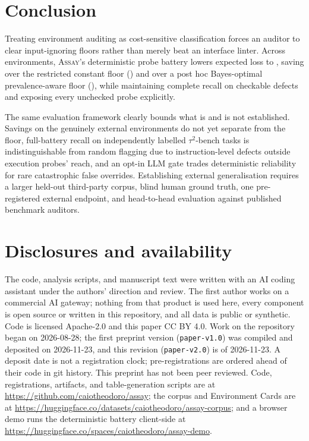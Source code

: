 \documentclass[11pt]{article}
\newcommand{\assay}{\textsc{Assay}}
\begin{document}
\section{Conclusion}
\label{sec:conclusion}

Treating environment auditing as cost-sensitive classification forces an auditor to clear
input-ignoring floors rather than merely beat an interface linter. Across \nEnv{} environments,
\assay{}'s deterministic probe battery lowers expected loss to \lossAssay{}, saving
\savedRestricted{} over the restricted constant floor (\floorRestricted{}) and \savedPrevResearch{}
over a post hoc Bayes-optimal prevalence-aware floor (\lossPrevResearch{}), while maintaining
complete recall on checkable defects and exposing every unchecked probe explicitly.

The same evaluation framework clearly bounds what is and is not established. Savings on the
\nExternal{} genuinely external environments do not yet separate from the floor, full-battery
recall on independently labelled $\tau^2$-bench tasks is indistinguishable from random flagging due
to instruction-level defects outside execution probes' reach, and an opt-in LLM gate trades
deterministic reliability for rare catastrophic false overrides. Establishing external
generalisation requires a larger held-out third-party corpus, blind human ground truth, one
pre-registered external endpoint, and head-to-head evaluation against published benchmark auditors.

\section*{Disclosures and availability}

The code, analysis scripts, and manuscript text were written with an AI coding assistant under the
authors' direction and review. The first author works on a commercial AI gateway; nothing from that
product is used here, every component is open source or written in this repository, and all data is
public or synthetic. Code is licensed Apache-2.0 and this paper CC BY 4.0. Work on the repository
began on 2026-08-28; the first preprint version (\texttt{paper-v1.0}) was compiled and deposited on
2026-11-23, and this revision (\texttt{paper-v2.0}) is of 2026-11-23. A deposit date is not a
registration clock; pre-registrations are ordered ahead of their code in git history. This preprint
has not been peer reviewed. Code, registrations, artifacts, and table-generation scripts are at
\url{https://github.com/caiotheodoro/assay}; the corpus and Environment Cards are at
\url{https://huggingface.co/datasets/caiotheodoro/assay-corpus}; and a browser demo runs the
deterministic battery client-side at
\url{https://huggingface.co/spaces/caiotheodoro/assay-demo}.
\end{document}
